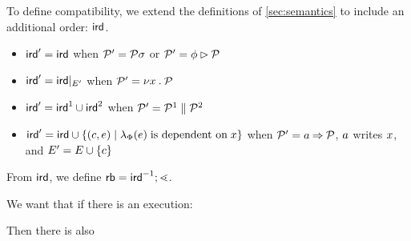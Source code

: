 To define compatibility, we extend the definitions of
\textsection\ref{sec:semantics} to include an additional order: $\mathrel{\mathsf{ird}}$.
\begin{itemize}
\item
  ${\mathrel{\mathsf{ird}}'} = {\mathrel{\mathsf{ird}}}$
  when $\mathcal{P}'=\mathcal{P}\sigma$
  or $\mathcal{P}'=\phi\mathbin\rhd\mathcal{P}$
\item
  ${\mathrel{\mathsf{ird}}'} = {\mathrel{\mathsf{ird}}}\mathbin{|}_{E'}$
  when $\mathcal{P}'=\nu x\mathbin.\mathcal{P}$
\item
  ${\mathrel{\mathsf{ird}}'} = {\mathrel{\mathsf{ird}}}^1\cup{\ensuremath{\mathrel{\mathsf{ird}}}}^2$
  when $\mathcal{P}'=\mathcal{P}^1\parallel\mathcal{P}^2$
\item
  ${\mathrel{\mathsf{ird}}'} = {\mathrel{\mathsf{ird}}}\cup\{(c,e)\mid\lambda_{\Phi}(e) \;\text{is dependent on}\; x\}$
  when $\mathcal{P}'=a\mathbin\Rightarrow\mathcal{P}$, $a$ writes $x$, and $E' = E \cup \{c\}$
\end{itemize}

From $\mathrel{\mathsf{ird}}$, we define ${\mathrel{\mathsf{rb}}}={\mathrel{\mathsf{ird}}}^{-1};{\lessdot}$.

We want that if there is an execution:
\begin{tikzdisplay}[node distance=1em]
\end{tikzdisplay}
Then there is also
\begin{tikzdisplay}[node distance=1em]
\end{tikzdisplay}



